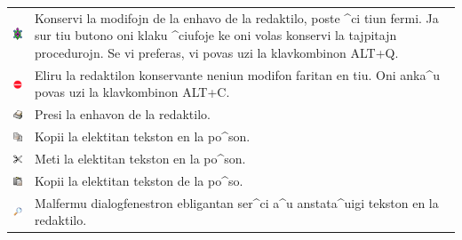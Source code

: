\begin{longtable}{cm{12cm}}
  \includegraphics*[scale=1]{bildoj/tortue.png} &
  Konservi la modifojn de la enhavo de la redaktilo, poste ^ci tiun
  fermi.  Ja sur tiu butono oni klaku ^ciufoje ke oni volas konservi
  la tajpitajn procedurojn.  Se vi preferas, vi povas uzi la
  klavkombinon ALT+Q. \\
  \includegraphics*[scale=1]{bildoj/quit.png} &
  Eliru la redaktilon konservante neniun modifon faritan en tiu.  Oni
  anka^u povas uzi la klavkombinon ALT+C. \\
  \includegraphics*[scale=1]{bildoj/fileprint.png} & 
  Presi la enhavon de la redaktilo.\\
  \includegraphics*[scale=1]{bildoj/editcopy.png} & 
  Kopii la elektitan tekston en la po^son.\\
  \includegraphics*[scale=1]{bildoj/editcut.png} & 
  Meti la elektitan tekston en la po^son.\\
  \includegraphics*[scale=1]{bildoj/editpaste.png} & 
  Kopii la elektitan tekston de la po^so.\\
  \includegraphics*[scale=1]{bildoj/chercher.png} &
  Malfermu dialogfenestron ebligantan ser^ci a^u anstata^uigi tekston
  en la redaktilo. \\
\end{longtable} 
